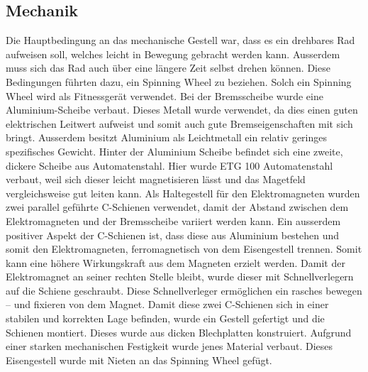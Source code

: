 \subsection{Mechanik}
Die Hauptbedingung an das mechanische Gestell war, dass es ein drehbares Rad aufweisen soll, welches leicht in Bewegung gebracht werden kann. Ausserdem muss sich das Rad auch über eine längere Zeit selbst drehen können. Diese Bedingungen führten dazu, ein Spinning Wheel zu beziehen. Solch ein Spinning Wheel wird als Fitnessgerät verwendet. 
\newpara
Bei der Bremsscheibe wurde eine Aluminium-Scheibe verbaut. Dieses Metall wurde verwendet, da dies einen guten elektrischen Leitwert aufweist und somit auch gute Bremseigenschaften mit sich bringt. Ausserdem besitzt Aluminium als Leichtmetall ein relativ geringes spezifisches Gewicht.
\newpara
Hinter der Aluminium Scheibe befindet sich eine zweite, dickere Scheibe aus Automatenstahl. Hier wurde ETG 100 Automatenstahl verbaut, weil sich dieser leicht magnetisieren lässt und das Magetfeld vergleichsweise gut leiten kann.
\newpara
Als Haltegestell für den Elektromagneten wurden zwei parallel geführte C-Schienen verwendet, damit der Abstand zwischen dem Elektromagneten und der Bremsscheibe variiert werden kann. Ein ausserdem positiver Aspekt der C-Schienen ist, dass diese aus Aluminium bestehen und somit den Elektromagneten, ferromagnetisch von dem Eisengestell trennen. Somit kann eine höhere Wirkungskraft aus dem Magneten erzielt werden. Damit der Elektromagnet an seiner rechten Stelle bleibt, wurde dieser mit Schnellverlegern auf die Schiene geschraubt. Diese Schnellverleger ermöglichen ein rasches bewegen – und fixieren von dem Magnet. 
\newpara
Damit diese zwei C-Schienen sich in einer stabilen und korrekten Lage befinden, wurde ein Gestell gefertigt und die Schienen montiert. Dieses wurde aus dicken Blechplatten konstruiert. Aufgrund einer starken mechanischen Festigkeit wurde jenes Material verbaut. Dieses Eisengestell wurde mit Nieten an das Spinning Wheel gefügt.
